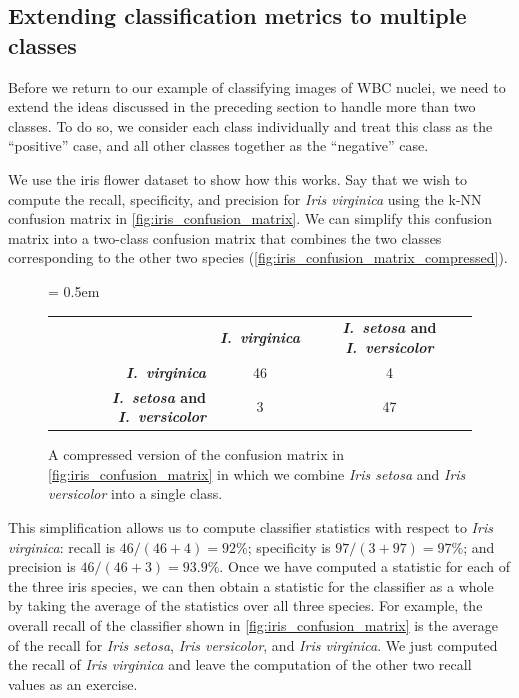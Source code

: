 \FloatBarrier
{}
\subsection{Extending classification metrics to multiple classes}

Before we return to our example of classifying images of WBC nuclei, we need to extend the ideas discussed in the preceding section to handle more than two classes. To do so, we consider each class individually and treat this class as the ``positive'' case, and all other classes together as the ``negative'' case.

We use the iris flower dataset to show how this works. Say that we wish to compute the recall, specificity, and precision for \textit{Iris virginica} using the k-NN confusion matrix in \autoref{fig:iris_confusion_matrix}. We can simplify this confusion matrix into a two-class confusion matrix that combines the two classes corresponding to the other two species (\autoref{fig:iris_confusion_matrix_compressed}).\\

 \begin{figure}[h]
\centering
\tabcolsep = 0.5em
\mySfFamily
\begin{tabular}{r c c}
\rowcolor{gray!50}
& \textbf{\textit{I.~virginica}} & \textbf{\textit{I.~setosa} and \textit{I.~versicolor}} \\
\textbf{\textit{I.~virginica}} & 46 & \phantom{5}4 \\
\textbf{\textit{I.~setosa} and \textit{I.~versicolor}} & \phantom{5}3 & 47 \\
\end{tabular}
\caption{A compressed version of the confusion matrix in \autoref{fig:iris_confusion_matrix} in which we combine \textit{Iris setosa} and \textit{Iris versicolor} into a single class.}
\label{fig:iris_confusion_matrix_compressed}
\end{figure}

This simplification allows us to compute classifier statistics with respect to \textit{Iris virginica}: recall is $46/(46+4) = 92\%$; specificity is $97/(3+97) = 97\%$; and precision is $46/(46+3) = 93.9\%$. Once we have computed a statistic for each of the three iris species, we can then obtain a statistic for the classifier as a whole by taking the average of the statistics over all three species. For example, the overall recall of the classifier shown in \autoref{fig:iris_confusion_matrix} is the average of the recall for \textit{Iris setosa}, \textit{Iris versicolor}, and \textit{Iris virginica}. We just computed the recall of \textit{Iris virginica} and leave the computation of the other two recall values as an exercise.\\

